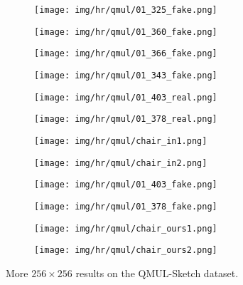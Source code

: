 \documentclass[10pt,twocolumn,letterpaper]{article}
\begin{document}
\begin{figure*}[tbp]
\begin{center}
\begin{subfigure}[b]{\hrwidth\linewidth}
  \texttt{[image: img/hr/qmul/01\_325\_fake.png]}
  \end{subfigure}
  \begin{subfigure}[b]{\hrwidth\linewidth}
  \texttt{[image: img/hr/qmul/01\_360\_fake.png]}
  \end{subfigure}
\begin{subfigure}[b]{\hrwidth\linewidth}
  \texttt{[image: img/hr/qmul/01\_366\_fake.png]}
  \end{subfigure}
  \begin{subfigure}[b]{\hrwidth\linewidth}
  \texttt{[image: img/hr/qmul/01\_343\_fake.png]}
  \end{subfigure}
  
\begin{subfigure}[b]{\hrwidth\linewidth}
  \texttt{[image: img/hr/qmul/01\_403\_real.png]}
  \end{subfigure}
  \begin{subfigure}[b]{\hrwidth\linewidth}
  \texttt{[image: img/hr/qmul/01\_378\_real.png]}
  \end{subfigure}
\begin{subfigure}[b]{\hrwidth\linewidth}
  \texttt{[image: img/hr/qmul/chair\_in1.png]}
  \end{subfigure}
  \begin{subfigure}[b]{\hrwidth\linewidth}
  \texttt{[image: img/hr/qmul/chair\_in2.png]}
  \end{subfigure}
  
\begin{subfigure}[b]{\hrwidth\linewidth}
  \texttt{[image: img/hr/qmul/01\_403\_fake.png]}
  \end{subfigure}
  \begin{subfigure}[b]{\hrwidth\linewidth}
  \texttt{[image: img/hr/qmul/01\_378\_fake.png]}
  \end{subfigure}
\begin{subfigure}[b]{\hrwidth\linewidth}
  \texttt{[image: img/hr/qmul/chair\_ours1.png]}
  \end{subfigure}
  \begin{subfigure}[b]{\hrwidth\linewidth}
  \texttt{[image: img/hr/qmul/chair\_ours2.png]}
  \end{subfigure}
  
\end{center}
\caption{More $256\times 256$ results on the QMUL-Sketch dataset.}
 \label{fig:hr_qmul}
\end{figure*}
\end{document}
